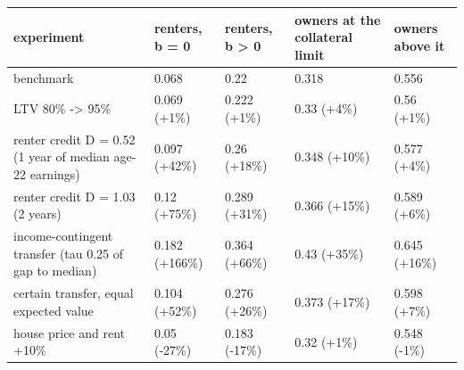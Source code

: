 \begingroup\small
\setlength{\tabcolsep}{3pt}
\renewcommand{\arraystretch}{1.04}
\begin{tabularx}{\linewidth}{XXXXX}
\toprule
experiment & renters, b = 0 & renters, b \textgreater{} 0 & owners at the collateral limit & owners above it \\
\midrule
benchmark & 0.068 & 0.22 & 0.318 & 0.556 \\
LTV 80\% -\textgreater{} 95\% & 0.069 (+1\%) & 0.222 (+1\%) & 0.33 (+4\%) & 0.56 (+1\%) \\
renter credit D = 0.52 (1 year of median age-22 earnings) & 0.097 (+42\%) & 0.26 (+18\%) & 0.348 (+10\%) & 0.577 (+4\%) \\
renter credit D = 1.03 (2 years) & 0.12 (+75\%) & 0.289 (+31\%) & 0.366 (+15\%) & 0.589 (+6\%) \\
income-contingent transfer (tau 0.25 of gap to median) & 0.182 (+166\%) & 0.364 (+66\%) & 0.43 (+35\%) & 0.645 (+16\%) \\
certain transfer, equal expected value & 0.104 (+52\%) & 0.276 (+26\%) & 0.373 (+17\%) & 0.598 (+7\%) \\
house price and rent +10\% & 0.05 (-27\%) & 0.183 (-17\%) & 0.32 (+1\%) & 0.548 (-1\%) \\
\bottomrule
\end{tabularx}
\endgroup
